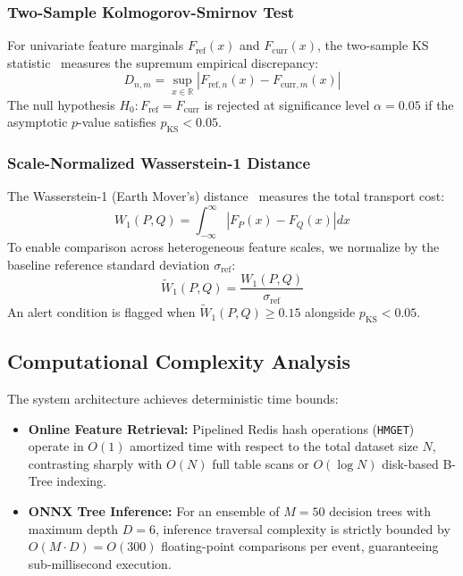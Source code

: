 \subsubsection{Two-Sample Kolmogorov-Smirnov Test}
For univariate feature marginals $F_{\text{ref}}(x)$ and $F_{\text{curr}}(x)$, the two-sample KS statistic~\cite{kolmogorov1933sulla,smirnov1948table} measures the supremum empirical discrepancy:
\begin{equation}
D_{n, m} = \sup_{x \in \mathbb{R}} \left| F_{\text{ref}, n}(x) - F_{\text{curr}, m}(x) \right|
\end{equation}
The null hypothesis $H_0: F_{\text{ref}} = F_{\text{curr}}$ is rejected at significance level $\alpha = 0.05$ if the asymptotic $p$-value satisfies $p_{\text{KS}} < 0.05$.

\subsubsection{Scale-Normalized Wasserstein-1 Distance}
The Wasserstein-1 (Earth Mover's) distance~\cite{villani2008optimal} measures the total transport cost:
\begin{equation}
W_1(P, Q) = \int_{-\infty}^\infty \left| F_P(x) - F_Q(x) \right| dx
\end{equation}
To enable comparison across heterogeneous feature scales, we normalize by the baseline reference standard deviation $\sigma_{\text{ref}}$:
\begin{equation}
\widetilde{W}_1(P, Q) = \frac{W_1(P, Q)}{\sigma_{\text{ref}}}
\end{equation}
An alert condition is flagged when $\widetilde{W}_1(P, Q) \ge 0.15$ alongside $p_{\text{KS}} < 0.05$.

\subsection{Computational Complexity Analysis}
The system architecture achieves deterministic time bounds:
\begin{itemize}
    \item \textbf{Online Feature Retrieval:} Pipelined Redis hash operations (\texttt{HMGET}) operate in $O(1)$ amortized time with respect to the total dataset size $N$, contrasting sharply with $O(N)$ full table scans or $O(\log N)$ disk-based B-Tree indexing.
    \item \textbf{ONNX Tree Inference:} For an ensemble of $M=50$ decision trees with maximum depth $D=6$, inference traversal complexity is strictly bounded by $O(M \cdot D) = O(300)$ floating-point comparisons per event, guaranteeing sub-millisecond execution.
\end{itemize}

